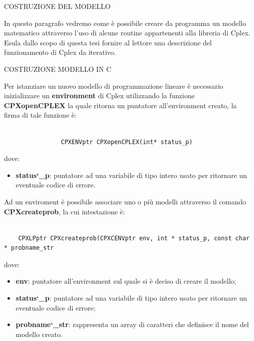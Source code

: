 \documentclass[11pt]{article}
\begin{document}
\vspace{2\baselineskip}
COSTRUZIONE DEL MODELLO
\vspace{2\baselineskip}

In questo paragrafo vedremo come \`e possibile creare da programma un modello matematico attraverso l'uso di alcune routine appartenenti alla libreria di Cplex. Esula dallo scopo di questa tesi fornire al lettore una descrizione del funzionamento di Cplex da iterativo.


\vspace{2\baselineskip}
COSTRUZIONE MODELLO IN C
\vspace{2\baselineskip}

Per istanziare un nuovo modello di programmazione lineare \`e necessario inizializzare un \textbf{environment} di Cplex utilizzando la funzione \textbf{CPXopenCPLEX} la quale ritorna un puntatore all'environment creato, la firma di tale funzione \`e:


\begin{lstlisting}

                CPXENVptr CPXopenCPLEX(int* status_p)

\end{lstlisting}

dove:

\begin{itemize}
\item \textbf{status\char`_p}: puntatore ad una variabile di tipo intero usato per ritornare un eventuale codice di errore.
\end{itemize}


Ad un enviroment è possibile associare uno o pi\`u modelli attraverso il comando \textbf{CPXcreateprob}, la cui intestazione \`e:

\begin{lstlisting}

    CPXLPptr CPXcreateprob(CPXCENVptr env, int * status_p, const char * probname_str

\end{lstlisting}


dove:

\begin{itemize}
	\item \textbf{env}: puntatore all'environment sul quale si \`e deciso di creare il modello;
	\item \textbf{status\char`_p}: puntatore ad una variabile di tipo intero usato per ritornare un eventuale codice di errore;
	\item \textbf{probname\char`_str}: rappresenta un array di caratteri che definisce il nome del modello creato.
\end{itemize}
\end{document}
